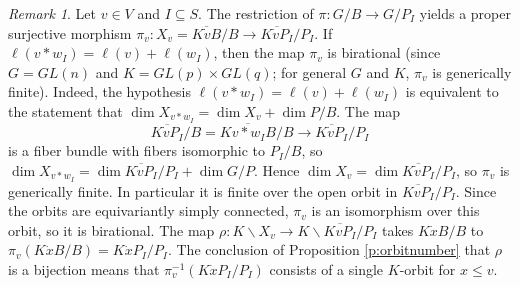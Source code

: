 \documentclass[11pt,letterpaper,reqno]{amsart}
\numberwithin{equation}{section}
\theoremstyle{plain}
\theoremstyle{definition}
\theoremstyle{remark}
\newtheorem{remark}[theorem]{Remark}
\begin{document}
\begin{remark} \label{r:birational}
Let $v \in V$ and $I \subseteq S$.  The restriction of $\pi: G/B \to G/P_I$ yields a proper surjective morphism $\pi_v: X_v = \overline{K\dot{v}B}/B \to \overline{K\dot{v}P_I}/P_I$.
If $\ell(v * w_I) = \ell(v) + \ell(w_I)$, then the map $\pi_v$ is birational (since $G = GL(n)$ and $K = GL(p) \times GL(q)$; for
general $G$ and $K$, $\pi_v$ is generically finite).
Indeed, the hypothesis $\ell(v * w_I) = \ell(v) + \ell(w_I)$ is equivalent to the statement that $\dim X_{v*w_I} = \dim X_v + \dim P/B$.  The map
$$
\overline{K \dot{v} P_I}/B = \overline{K v* w_I B}/ B \to \overline{K \dot{v} P_I}/P_I
$$
is a fiber bundle with fibers isomorphic to $P_I/B$, so $\dim X_{v*w_I} = \dim  \overline{K \dot{v} P_I}/P_I + \dim G/P$.  
Hence $\dim X_v = \dim  \overline{K \dot{v} P_I}/P_I$, so $\pi_v$ is generically finite.  In particular it is finite over the open orbit in $\overline{K v P_I}/P_I$.
Since the orbits are equivariantly simply connected, $\pi_v$ is an isomorphism over this orbit, so it is birational.   
The map
$\rho: K \backslash X_v \rightarrow K \backslash \overline{KvP_I}/P_I$ takes $K \dot{x} B/B$ to $\pi_v(K \dot{x} B/B) = K \dot{x} P_I/P_I$.
The conclusion of Proposition \ref{p:orbitnumber} that $\rho$ is a bijection means that  $\pi_v^{-1} (K \dot{x} P_I/P_I)$ consists
of a single $K$-orbit for $x \leq v$.
\end{remark}
\end{document}
